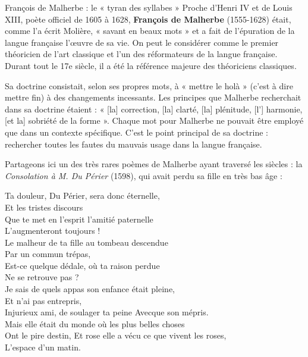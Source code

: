 \begin{bbcomplement}{François de Malherbe : le « tyran des syllabes »}
Proche d’Henri IV et de Louis XIII, poète officiel de 1605 à 1628, \textbf{François de Malherbe} (1555-1628) était, comme l’a écrit Molière, « savant en beaux mots » et a fait de l’épuration de la langue française l’œuvre de sa vie. On peut le considérer comme le premier théoricien de l’art classique et l’un des réformateurs de la langue française. Durant tout le 17e siècle, il a été la référence majeure des théoriciens classiques.

Sa doctrine consistait, selon ses propres mots, à « mettre le holà » (c’est à dire mettre fin) à des changements incessants. Les principes que Malherbe recherchait dans sa doctrine étaient : « [la] correction, [la] clarté, [la] plénitude, [l’] harmonie, [et la] sobriété de la forme ». Chaque mot pour Malherbe ne pouvait être employé que dans un contexte spécifique. C’est le point principal de sa doctrine : rechercher toutes les fautes du mauvais usage dans la langue française.

Partageons ici un des très rares poèmes de Malherbe ayant traversé les siècles : la \textit{Consolation à M. Du Périer} (1598), qui avait perdu sa fille en très bas âge :
\begin{center}
Ta douleur, Du Périer, sera donc éternelle,\\
Et les tristes discours\\
Que te met en l’esprit l’amitié paternelle\\
L’augmenteront toujours !\\
Le malheur de ta fille au tombeau descendue\\
Par un commun trépas,\\
Est-ce quelque dédale, où ta raison perdue\\
Ne se retrouve pas ?\\
Je sais de quels appas son enfance était pleine,\\
Et n’ai pas entrepris,\\
Injurieux ami, de soulager ta peine Avecque son mépris.\\
Mais elle était du monde où les plus belles choses\\
Ont le pire destin, Et rose elle a vécu ce que vivent les roses,\\
L’espace d’un matin.
\end{center}
\end{bbcomplement}
